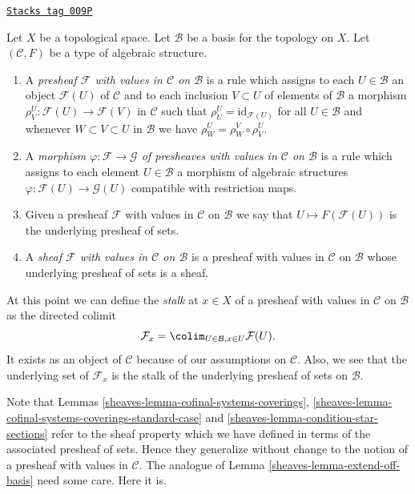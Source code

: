 \begin{definition}
\label{sheaves-definition-sheaf-structures-basis}
\href{https://stacks.math.columbia.edu/tag/009P}{\texttt{Stacks tag 009P}}

Let $X$ be a topological space. Let $\mathcal{B}$ be a
basis for the topology on $X$. Let $(\mathcal{C}, F)$ be
a type of algebraic structure.
\begin{enumerate}
\item A {\it presheaf $\mathcal{F}$ with values in $\mathcal{C}$
on $\mathcal{B}$} is a rule which assigns to each
$U \in \mathcal{B}$ an object
$\mathcal{F}(U)$ of $\mathcal{C}$ and to each inclusion $V \subset U$
of elements of $\mathcal{B}$ a morphism
$\rho^U_V : \mathcal{F}(U) \to \mathcal{F}(V)$ in $\mathcal{C}$ such that
$\rho^U_U = \text{id}_{\mathcal{F}(U)}$ for all $U \in \mathcal{B}$ and
whenever $W \subset V \subset U$ in $\mathcal{B}$ we have
$\rho^U_W = \rho^V_W \circ \rho ^U_V$.
\item A {\it morphism $\varphi : \mathcal{F} \to \mathcal{G}$
of presheaves with values in $\mathcal{C}$
on $\mathcal{B}$} is a rule which assigns to each
element $U \in \mathcal{B}$ a morphism of
algebraic structures $\varphi : \mathcal{F}(U) \to \mathcal{G}(U)$
compatible with restriction maps.
\item Given a presheaf $\mathcal{F}$ with values in $\mathcal{C}$
on $\mathcal{B}$ we say that $U \mapsto F(\mathcal{F}(U))$ is the
underlying presheaf of sets.
\item A {\it sheaf $\mathcal{F}$ with values in $\mathcal{C}$
on $\mathcal{B}$} is a presheaf with values in $\mathcal{C}$
on $\mathcal{B}$ whose underlying presheaf of sets is a sheaf.
\end{enumerate}
\end{definition}

At this point we can define the {\it stalk} at $x \in X$
of a presheaf with values in $\mathcal{C}$ on $\mathcal{B}$
as the directed colimit
$$
\mathcal{F}_x = \colim_{U\in \mathcal{B}, x\in U} \mathcal{F}(U).
$$
It exists as an object of $\mathcal{C}$
because of our assumptions on $\mathcal{C}$.
Also, we see that the underlying set of $\mathcal{F}_x$
is the stalk of the underlying presheaf of sets on $\mathcal{B}$.

\medskip\noindent
Note that Lemmas \ref{sheaves-lemma-cofinal-systems-coverings},
\ref{sheaves-lemma-cofinal-systems-coverings-standard-case} and
\ref{sheaves-lemma-condition-star-sections} refer to the sheaf
property which we have defined in terms of the associated presheaf
of sets. Hence they generalize without change to the notion
of a presheaf with values in $\mathcal{C}$. The analogue of
Lemma \ref{sheaves-lemma-extend-off-basis} need some care. Here it is.


